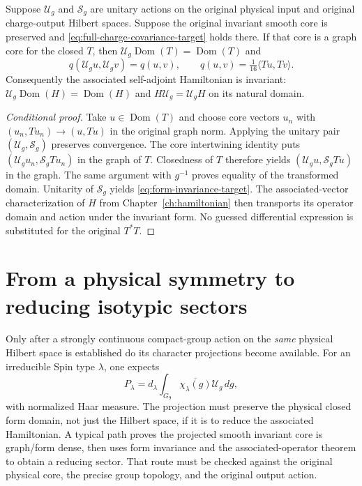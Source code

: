 \begin{proposition}
\label{prop:closed-form-transport}
Suppose $\mathcal U_g$ and $\mathcal S_g$ are unitary actions on the
original physical input and original charge-output Hilbert spaces.
Suppose the original invariant smooth core is preserved and
\eqref{eq:full-charge-covariance-target} holds there. If that core
is a graph core for the closed $T$, then
$\mathcal U_g\operatorname{Dom}(T)=\operatorname{Dom}(T)$ and
\begin{equation}\label{eq:form-invariance-target}
 q(\mathcal U_gu,\mathcal U_gv)=q(u,v),\qquad
 q(u,v)=\tfrac1{16}\langle Tu,Tv\rangle.
\end{equation}
Consequently the associated self-adjoint Hamiltonian is invariant:
$\mathcal U_g\operatorname{Dom}(H)=\operatorname{Dom}(H)$ and
$H\mathcal U_g=\mathcal U_gH$ on its natural domain.
\end{proposition}
\begin{proof}[Conditional proof]
Take $u\in\operatorname{Dom}(T)$ and choose core vectors $u_n$ with
$(u_n,Tu_n)\to(u,Tu)$ in the original graph norm. Applying the unitary
pair $(\mathcal U_g,\mathcal S_g)$ preserves convergence. The core
intertwining identity puts
$(\mathcal U_gu_n,\mathcal S_gTu_n)$ in the graph of $T$. Closedness
of $T$ therefore yields
$(\mathcal U_gu,\mathcal S_gTu)$ in the graph. The same argument
with $g^{-1}$ proves equality of the transformed domain.
Unitarity of $\mathcal S_g$ yields \eqref{eq:form-invariance-target}.
The associated-vector characterization of $H$ from
Chapter~\ref{ch:hamiltonian} then transports its operator domain and
action under the invariant form. No guessed differential expression
is substituted for the original $T^*T$.
\end{proof}

\section{From a physical symmetry to reducing isotypic sectors}
Only after a strongly continuous compact-group action on the \emph{same}
physical Hilbert space is established do its character projections
become available. For an irreducible Spin type $\lambda$, one expects
\begin{equation}\label{eq:isotype-projector}
 P_\lambda=d_\lambda\int_{G_9}
   \overline{\chi_\lambda(g)}\mathcal U_g\,dg,
\end{equation}
with normalized Haar measure. The projection must preserve the
physical closed form domain, not just the Hilbert space, if it is to
reduce the associated Hamiltonian. A typical path proves the
projected smooth invariant core is graph/form dense, then uses form
invariance and the associated-operator theorem to obtain a reducing
sector. That route must be checked against the original physical
core, the precise group topology, and the original output action.

